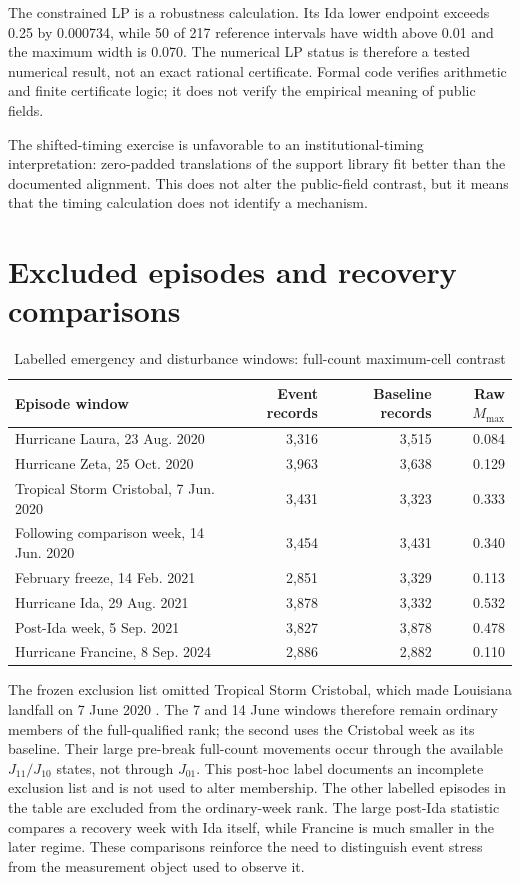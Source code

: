 \documentclass[11pt]{article}
\begin{document}
The constrained LP is a robustness calculation. Its Ida lower endpoint exceeds 0.25 by 0.000734, while 50 of 217 reference intervals have width above 0.01 and the maximum width is 0.070. The numerical LP status is therefore a tested numerical result, not an exact rational certificate. Formal code verifies arithmetic and finite certificate logic; it does not verify the empirical meaning of public fields.

The shifted-timing exercise is unfavorable to an institutional-timing interpretation: zero-padded translations of the support library fit better than the documented alignment. This does not alter the public-field contrast, but it means that the timing calculation does not identify a mechanism.

\section{Excluded episodes and recovery comparisons}

\begin{table}[t]
\centering
\caption{Labelled emergency and disturbance windows: full-count maximum-cell contrast}
\label{tab:episodes}
\begin{tabular}{@{}lrrr@{}}
\toprule
Episode window & Event records & Baseline records & Raw $M_{\max}$ \\
\midrule
Hurricane Laura, 23 Aug. 2020 & 3,316 & 3,515 & 0.084 \\
Hurricane Zeta, 25 Oct. 2020 & 3,963 & 3,638 & 0.129 \\
Tropical Storm Cristobal, 7 Jun. 2020 & 3,431 & 3,323 & 0.333 \\
Following comparison week, 14 Jun. 2020 & 3,454 & 3,431 & 0.340 \\
February freeze, 14 Feb. 2021 & 2,851 & 3,329 & 0.113 \\
Hurricane Ida, 29 Aug. 2021 & 3,878 & 3,332 & 0.532 \\
Post-Ida week, 5 Sep. 2021 & 3,827 & 3,878 & 0.478 \\
Hurricane Francine, 8 Sep. 2024 & 2,886 & 2,882 & 0.110 \\
\bottomrule
\end{tabular}
\end{table}

The frozen exclusion list omitted Tropical Storm Cristobal, which made Louisiana landfall on 7 June 2020 \citep{NHC2020Cristobal}. The 7 and 14 June windows therefore remain ordinary members of the full-qualified rank; the second uses the Cristobal week as its baseline. Their large pre-break full-count movements occur through the available $J_{11}/J_{10}$ states, not through $J_{01}$. This post-hoc label documents an incomplete exclusion list and is not used to alter membership. The other labelled episodes in the table are excluded from the ordinary-week rank. The large post-Ida statistic compares a recovery week with Ida itself, while Francine is much smaller in the later regime. These comparisons reinforce the need to distinguish event stress from the measurement object used to observe it.
\end{document}
